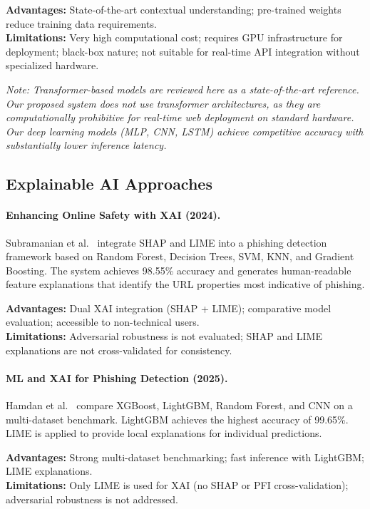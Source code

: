 \textbf{Advantages:} State-of-the-art contextual understanding; pre-trained weights reduce training data requirements.\\
\textbf{Limitations:} Very high computational cost; requires GPU infrastructure for deployment; black-box nature; not suitable for real-time API integration without specialized hardware.

\textit{Note: Transformer-based models are reviewed here as a state-of-the-art reference. Our proposed system does not use transformer architectures, as they are computationally prohibitive for real-time web deployment on standard hardware. Our deep learning models (MLP, CNN, LSTM) achieve competitive accuracy with substantially lower inference latency.}

\subsection{Explainable AI Approaches}

\paragraph{Enhancing Online Safety with XAI (2024).}
Subramanian et al.~\cite{ref_amrita} integrate SHAP and LIME into a phishing detection framework based on Random Forest, Decision Trees, SVM, KNN, and Gradient Boosting. The system achieves 98.55\% accuracy and generates human-readable feature explanations that identify the URL properties most indicative of phishing.

\textbf{Advantages:} Dual XAI integration (SHAP + LIME); comparative model evaluation; accessible to non-technical users.\\
\textbf{Limitations:} Adversarial robustness is not evaluated; SHAP and LIME explanations are not cross-validated for consistency.

\paragraph{ML and XAI for Phishing Detection (2025).}
Hamdan et al.~\cite{ref_vfast} compare XGBoost, LightGBM, Random Forest, and CNN on a multi-dataset benchmark. LightGBM achieves the highest accuracy of 99.65\%. LIME is applied to provide local explanations for individual predictions.

\textbf{Advantages:} Strong multi-dataset benchmarking; fast inference with LightGBM; LIME explanations.\\
\textbf{Limitations:} Only LIME is used for XAI (no SHAP or PFI cross-validation); adversarial robustness is not addressed.


